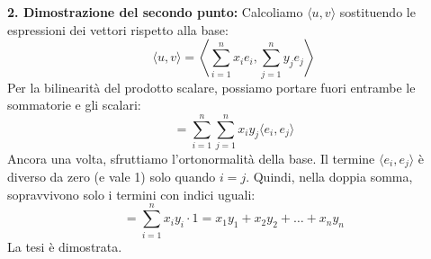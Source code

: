 {{        \bigskip
        \textbf{2. Dimostrazione del secondo punto:}
        Calcoliamo \(\langle u, v \rangle\) sostituendo le espressioni dei vettori rispetto alla base:
        \[
        \langle u, v \rangle = \left\langle \sum_{i=1}^n x_i e_i, \sum_{j=1}^n y_j e_j \right\rangle
        \]
        Per la bilinearità del prodotto scalare, possiamo portare fuori entrambe le sommatorie e gli scalari:
        \[
        = \sum_{i=1}^n \sum_{j=1}^n x_i y_j \langle e_i, e_j \rangle
        \]
        Ancora una volta, sfruttiamo l'ortonormalità della base. Il termine \(\langle e_i, e_j \rangle\) è diverso da zero (e vale 1) solo quando \(i = j\).
        Quindi, nella doppia somma, sopravvivono solo i termini con indici uguali:
        \[
        = \sum_{i=1}^n x_i y_i \cdot 1 = x_1 y_1 + x_2 y_2 + \dots + x_n y_n
        \]
        La tesi è dimostrata.
    }
}

